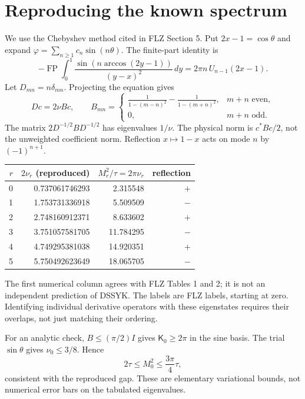 \documentclass[11pt,a4paper]{article}
\newcommand{\Kop}{\mathsf K}
\begin{document}
\section{Reproducing the known spectrum}
We use the Chebyshev method cited in FLZ Section 5. Put $2x-1=\cos\theta$
and expand $\varphi=\sum_{n\ge1}c_n\sin(n\theta)$. The finite-part identity is
\begin{equation}
 -\operatorname{FP}\!\int_0^1
 \frac{\sin(n\arccos(2y-1))}{(y-x)^2}\,dy
 =2\pi n\,U_{n-1}(2x-1).
\end{equation}
Let $D_{mn}=n\delta_{mn}$. Projecting the equation gives
\begin{equation}
 Dc=2\nu Bc,\qquad
 B_{mn}=\begin{cases}
 \displaystyle\frac1{1-(m-n)^2}-\frac1{1-(m+n)^2},&m+n\text{ even},\\
 0,&m+n\text{ odd}.
 \end{cases}
\end{equation}
The matrix $2D^{-1/2}BD^{-1/2}$ has eigenvalues $1/\nu$.
The physical norm is $c^*Bc/2$, not the unweighted coefficient norm.
Reflection $x\mapsto1-x$ acts on mode $n$ by $(-1)^{n+1}$.

\begin{center}
\begin{tabular}{rrrr}
\toprule
$r$ & $2\nu_r$ (reproduced) & $M_r^2/\tau=2\pi\nu_r$ & reflection\\
\midrule
0 & 0.737061746293 & 2.315548 & $+$\\
1 & 1.753731336918 & 5.509509 & $-$\\
2 & 2.748160912371 & 8.633602 & $+$\\
3 & 3.751057581705 & 11.784295 & $-$\\
4 & 4.749295381038 & 14.920351 & $+$\\
5 & 5.750492623649 & 18.065705 & $-$\\
\bottomrule
\end{tabular}
\end{center}
The first numerical column agrees with FLZ Tables 1 and 2; it is not an
independent prediction of DSSYK. The labels are FLZ labels, starting
at zero. Identifying individual derivative operators with these
eigenstates requires their overlaps, not just matching their ordering.

For an analytic check, $B\le(\pi/2)I$ gives
$\Kop_0\ge2\pi$ in the sine basis. The trial $\sin\theta$ gives
$\nu_0\le3/8$. Hence
\begin{equation}
 2\tau\le M_0^2\le\frac{3\pi}{4}\tau,
\end{equation}
consistent with the reproduced gap. These are elementary variational
bounds, not numerical error bars on the tabulated eigenvalues.
\end{document}
